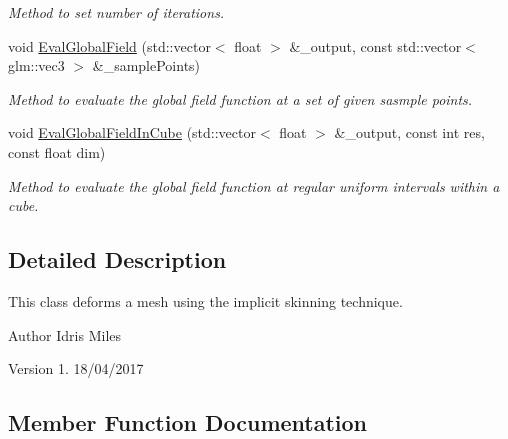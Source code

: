\begin{DoxyCompactItemize}
\begin{DoxyCompactList}\small\item\em Method to set number of iterations. \end{DoxyCompactList}\item 
void \hyperlink{classImplicitSkinDeformer_a53fe153bdf7345773a2b1d2ad4b2698e}{Eval\+Global\+Field} (std\+::vector$<$ float $>$ \&\+\_\+output, const std\+::vector$<$ glm\+::vec3 $>$ \&\+\_\+sample\+Points)
\begin{DoxyCompactList}\small\item\em Method to evaluate the global field function at a set of given sasmple points. \end{DoxyCompactList}\item 
void \hyperlink{classImplicitSkinDeformer_a8b9c5d17557ec3cf44ed982a8930e890}{Eval\+Global\+Field\+In\+Cube} (std\+::vector$<$ float $>$ \&\+\_\+output, const int res, const float dim)
\begin{DoxyCompactList}\small\item\em Method to evaluate the global field function at regular uniform intervals within a cube. \end{DoxyCompactList}\end{DoxyCompactItemize}


\subsection{Detailed Description}
This class deforms a mesh using the implicit skinning technique. 

\begin{DoxyAuthor}{Author}
Idris Miles 
\end{DoxyAuthor}
\begin{DoxyVersion}{Version}
1.  18/04/2017 
\end{DoxyVersion}


\subsection{Member Function Documentation}
